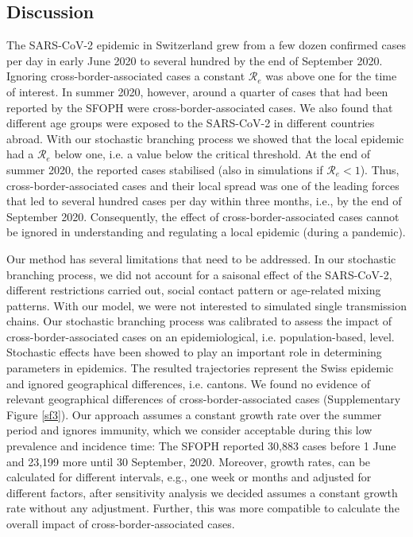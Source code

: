 \documentclass[10pt, a4paper, twoside]{article}
\begin{document}
\begin{multicols}{2}
\section{Discussion}
The SARS-CoV-2 epidemic in Switzerland grew from a few dozen confirmed cases per day in early June 2020 to several hundred by the end of September 2020. 
Ignoring cross-border-associated cases a constant $\mathcal{R}_e$ was above one for the time of interest. 
In summer 2020, however, around a quarter of cases that had been reported by the SFOPH were cross-border-associated cases.
We also found that different age groups were exposed to the SARS-CoV-2 in different countries abroad.
With our stochastic branching process we showed that the local epidemic had a $\mathcal{R}_e$ below one, i.e. a value below the critical threshold.
At the end of summer 2020, the reported cases stabilised (also in simulations if $\mathcal{R}_e <1$).
Thus, cross-border-associated cases and their local spread was one of the leading forces that led to several hundred cases per day within three months, i.e., by the end of September 2020. 
Consequently, the effect of cross-border-associated cases cannot be ignored in understanding and regulating a local epidemic (during a pandemic).

Our method has several limitations that need to be addressed.
In our stochastic branching process, we did not account for a saisonal effect of the SARS-CoV-2, different restrictions carried out, social contact pattern or age-related mixing patterns.
With our model, we were not interested to simulated single transmission chains.
Our stochastic branching process was calibrated to assess the impact of cross-border-associated cases on an epidemiological, i.e. population-based, level.
Stochastic effects have been showed to play an important role in determining parameters in epidemics.\cite{althaus_ebola_2015,riou_pattern_2020}
The resulted trajectories represent the Swiss epidemic and ignored geographical differences, i.e. cantons.
We found no evidence of relevant geographical differences of cross-border-associated cases (Supplementary Figure \ref{sf3}).
Our approach assumes a constant growth rate over the summer period and ignores immunity, which we consider acceptable during this low prevalence and incidence time:
The SFOPH reported 30,883 cases before 1 June and 23,199 more until 30 September, 2020.
Moreover, growth rates, can be calculated for different intervals, e.g., one week or months and adjusted for different factors, after sensitivity analysis we decided assumes a constant growth rate without any adjustment.
Further, this was more compatible to calculate the overall impact of cross-border-associated cases.


\end{multicols}
\end{document}
